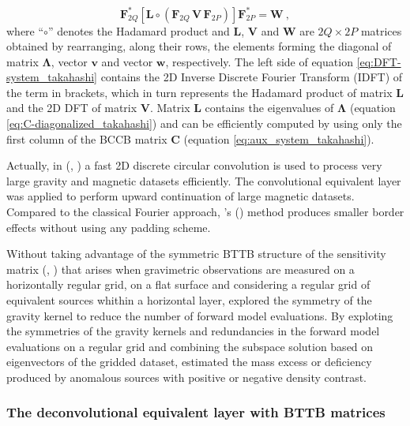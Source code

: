 \begin{equation}
\mathbf{F}_{2Q}^{\ast} \left[ 
\mathbf{L} \circ \left(\mathbf{F}_{2Q} \, \mathbf{V} \, \mathbf{F}_{2P} \right) 
\right] \mathbf{F}_{2P}^{\ast} = \mathbf{W} \: ,
\label{eq:DFT-system_takahashi}
\end{equation}
where ``$\circ$'' denotes the Hadamard product \citep[][ p. 298]{horn_johnson1991} and 
$\mathbf{L}$, $\mathbf{V}$ and $\mathbf{W}$ are $2Q \times 2P$ matrices obtained 
by rearranging, along their rows, the elements forming the diagonal of matrix 
$\boldsymbol{\Lambda}$, vector $\mathbf{v}$ and vector $\mathbf{w}$, respectively.
The left side of equation \ref{eq:DFT-system_takahashi} contains the 2D 
Inverse Discrete Fourier Transform (IDFT) of the term in brackets, which in turn
represents the Hadamard product of matrix $\mathbf{L}$ and the 2D DFT of matrix 
$\mathbf{V}$.
Matrix $\mathbf{L}$ contains the eigenvalues of $\boldsymbol{\Lambda}$ 
(equation \ref{eq:C-diagonalized_takahashi}) and can be 
efficiently computed by using only the first column of the BCCB matrix 
$\mathbf{C}$ (equation \ref{eq:aux_system_takahashi}).

Actually, in \citeauthor{takahashi2020} (\citeyear{takahashi2020}, \citeyear{takahashi2022}) 
a fast 2D discrete circular convolution \citep{vanloan1992} is used to  process 
very large gravity and magnetic datasets efficiently.
The convolutional equivalent layer was applied to perform upward continuation of large magnetic datasets. 
Compared to the classical Fourier approach, \citeauthor{takahashi2022}'s (\citeyear{takahashi2022}) method produces smaller border effects without using any padding scheme. 

Without taking advantage of the symmetric BTTB structure of the sensitivity matrix (\citeauthor{takahashi2020}, \citeyear{takahashi2020}) 
that arises when gravimetric observations are measured on a 
horizontally regular grid, on a flat surface and considering a regular grid 
of equivalent sources whithin a horizontal layer, \cite{mendoncca2020}  explored the symmetry of the gravity kernel to reduce the number of forward model evaluations.
By exploting the symmetries of the gravity kernels and redundancies in the forward model evaluations on a regular grid and combining the subspace solution based on eigenvectors of the gridded dataset, \cite{mendoncca2020}   
estimated the mass excess or deficiency produced by anomalous sources with positive or negative density contrast. 

\subsubsection{The deconvolutional equivalent layer with BTTB matrices}

